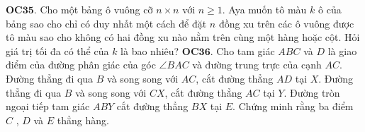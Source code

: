 \begin{multicols}{2}
	\vskip 0.1cm
	{\bf\color{cackithi} OC$\pmb{35.}$} Cho một bảng ô vuông cỡ $n \times n$ với $n\ge 1$. Aya muốn tô màu  $k$ ô của bảng  sao cho chỉ có duy nhất một cách để đặt  $n$ đồng xu trên các ô vuông được tô màu sao cho không có hai đồng xu nào nằm trên cùng một hàng hoặc cột. Hỏi giá trị tối đa có thể của $k$  là bao nhiêu?
	\vskip 0.1cm
	{\bf\color{cackithi} OC$\pmb{36.}$} Cho tam giác $ABC$ và $D$ là giao điểm của đường phân giác của góc $\angle BAC$ và đường trung trực của cạnh $AC$. Đường thẳng  đi qua $B$ và song song với $AC$, cắt đường thẳng $AD$ tại $X$. Đường thẳng đi qua $B$ và song song với $CX$, cắt đường thẳng $AC$ tại $Y$. Đường tròn ngoại tiếp tam giác $ABY$ cắt đường thẳng $BX$ tại $E.$ Chứng minh rằng ba điểm $C$ , $D$ và $E$ thẳng hàng.
\end{multicols}